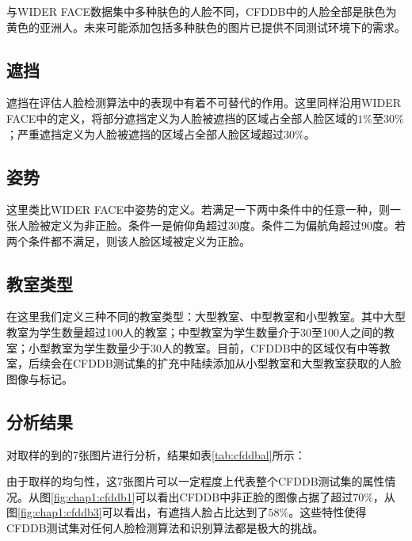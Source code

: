 与WIDER FACE数据集中多种肤色的人脸不同，CFDDB中的人脸全部是肤色为黄色的亚洲人。未来可能添加包括多种肤色的图片已提供不同测试环境下的需求。

\subsection{遮挡}

遮挡在评估人脸检测算法中的表现中有着不可替代的作用。这里同样沿用WIDER FACE中的定义，将部分遮挡定义为人脸被遮挡的区域占全部人脸区域的$1\%$至$30\%$；严重遮挡定义为人脸被遮挡的区域占全部人脸区域超过$30\%$。

\subsection{姿势}

这里类比WIDER FACE中姿势的定义。若满足一下两中条件中的任意一种，则一张人脸被定义为非正脸。条件一是俯仰角超过30度。条件二为偏航角超过90度。若两个条件都不满足，则该人脸区域被定义为正脸。

\subsection{教室类型}

在这里我们定义三种不同的教室类型：大型教室、中型教室和小型教室。其中大型教室为学生数量超过100人的教室；中型教室为学生数量介于30至100人之间的教室；小型教室为学生数量少于30人的教室。目前，CFDDB中的区域仅有中等教室，后续会在CFDDB测试集的扩充中陆续添加从小型教室和大型教室获取的人脸图像与标记。

\subsection{分析结果}

对取样的到的7张图片进行分析，结果如表\ref{tab:cfddbal}所示：

由于取样的均匀性，这7张图片可以一定程度上代表整个CFDDB测试集的属性情况。从图\ref{fig:chap1:cfddb1}可以看出CFDDB中非正脸的图像占据了超过$70\%$，从图\ref{fig:chap1:cfddb3}可以看出，有遮挡人脸占比达到了$58\%$。这些特性使得CFDDB测试集对任何人脸检测算法和识别算法都是极大的挑战。


